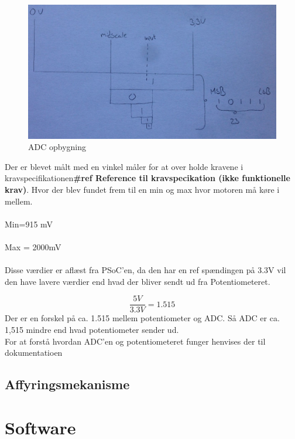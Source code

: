 \begin{figure}[H]
	\centering
	\includegraphics[width=\textwidth]{Afsnit/DesignOgImplementering/images/ADC}
	\caption{ADC opbygning}
	\label{fig:ADC12}
	\end{figure}

Der er blevet målt med en vinkel måler for at over holde kravene i kravspecifikationen\textbf{\#ref Reference til kravspecikation (ikke funktionelle krav)}. Hvor der blev fundet frem til en min og max hvor motoren må køre i mellem. \\
\\
Min=915 mV\\
\\
Max = 2000mV\\
\\
Disse værdier er aflæst fra PSoC’en, da den har en ref spændingen på 3.3V vil den have lavere værdier end hvad der bliver sendt ud fra Potentiometeret.


\begin{equation}
 \frac {5V} {3.3V}= 1.515
\end{equation}
Der er en forskel på ca. 1.515   mellem potentiometer og ADC. Så ADC er ca. 1,515 mindre end hvad potentiometer sender ud.
\\
For at forstå hvordan ADC’en og potentiometeret funger henvises der til dokumentatioen 

\subsection{Affyringsmekanisme}

\section{Software}

